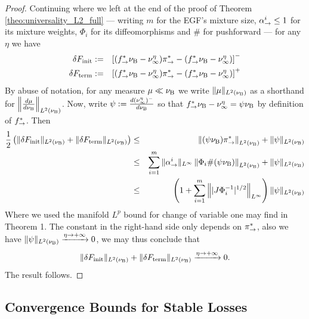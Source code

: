 \begin{proof}
    Continuing where we left at the end of the proof of Theorem \ref{theo:universality_L2_full} --- writing $m$ for the EGF's mixture size, $\alpha_{\rightarrow}^i\leq1$ for its mixture weights, $\Phi_i$ for its diffeomorphisms and $\#$ for pushforward --- for any $\eta$ we have
    \begin{eqnarray}
        \delta F_{\mathrm{init}} &:=&  \left[(f^*_{\rightarrow} \nu_{\mathrm{B}}- \nu_\infty^\eta)\pi_{\rightarrow}^*  -  (f^*_{\rightarrow} \nu_{\mathrm{B}}- \nu_\infty^\eta)\right]^-\\
        \delta F_{\mathrm{term}} &:=&  \left[(f^*_{\rightarrow} \nu_{\mathrm{B}}- \nu_\infty^\eta)\pi_{\rightarrow}^*  -  (f^*_{\rightarrow} \nu_{\mathrm{B}}- \nu_\infty^\eta)\right]^+
    \end{eqnarray}
    By abuse of notation, for any measure $\mu\ll \nu_{\mathrm{B}}$ we write $\|\mu\|_{L^2(\nu_{\mathrm{B}})}$ as a shorthand for $\left\|\frac{d\mu}{d\nu_{\mathrm{B}}}\right\|_{L^2(\nu_{\mathrm{B}})}$. Now, write $\psi:= \frac{d(\nu_{\infty}^\eta)^-}{d\nu_{\mathrm{B}}}$ so that $f^*_{\rightarrow}\nu_{\mathrm{B}} - \nu_\infty^\eta = \psi \nu_{\mathrm{B}}$ by definition of $f^*_{\rightarrow}$. Then
    \begin{eqnarray}
         \frac{1}{2}\left(\|\delta F_{\mathrm{init}}\|_{L^2(\nu_{\mathrm{B}})} +\|\delta F_{\mathrm{term}}\|_{L^2(\nu_{\mathrm{B}})}\right) &\leq& \left\|(\psi \nu_{\mathrm{B}})\pi_{\rightarrow}^*\right\|_{L^2(\nu_{\mathrm{B}})} + \| \psi\|_{L^2(\nu_{\mathrm{B}})}  \\
         &\leq&  \sum_{i=1}^m\|\alpha_{\rightarrow}^i\|_{L^\infty}\left\|\Phi_i\#(\psi \nu_{\mathrm{B}})\right\|_{L^2(\nu_{\mathrm{B}})} + \| \psi\|_{L^2(\nu_{\mathrm{B}})} \\
         &\leq & \left(1+\sum_{i=1}^m\left\| |J\Phi_i^{-1}|^{1/2}\right\|_{L^\infty}\right)\|\psi\|_{L^2(\nu_{\mathrm{B}})} \\
    \end{eqnarray}
    Where we used the manifold $L^p$ bound for change of variable one may find in \citet{stern2010p} Theorem 1. The constant in the right-hand side only depends on $\pi_{\rightarrow}^*$, also we have $\|\psi\|_{L^2(\nu_{\mathrm{B}})} \xrightarrow{\eta\rightarrow +\infty} 0$, we may thus conclude that
    \begin{equation}
        \|\delta F_{\mathrm{init}}\|_{L^2(\nu_{\mathrm{B}})}+\|\delta F_{\mathrm{term}}\|_{L^2(\nu_{\mathrm{B}})}  \xrightarrow{\eta\rightarrow +\infty} 0.
    \end{equation}
    The result follows.

\end{proof}

\subsection{Convergence Bounds for Stable Losses}\label{app:stable}

